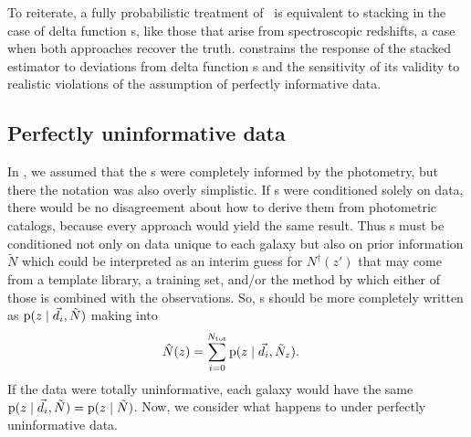 
To reiterate, a fully probabilistic treatment of \Nz\ is equivalent to stacking in the case of delta function \pzpdf s, like those that arise from spectroscopic redshifts, a case when both approaches recover the truth.
 constrains the response of the stacked estimator to deviations from delta function \pzpdf s and the sensitivity of its validity to realistic violations of the assumption of perfectly informative data.


\subsection{Perfectly uninformative data}

In , we assumed that the \pzpdf s were completely informed by the photometry, but there the notation was also overly simplistic.
If \pzpdf s were conditioned solely on data, there would be no disagreement about how to derive them from photometric catalogs, because every approach would yield the same result.
Thus \pzpdf s must be conditioned not only on data unique to each galaxy but also on prior information $\tilde{N}$ which could be interpreted as an interim guess for $N^{\dagger}(z')$ that may come from a template library, a training set, and/or the method by which either of those is combined with the observations.
So, \pzpdf s should be more completely written as $\mathrm{p}(z \mid \vec{d}_{i}, \tilde{N})$ making  into
\begin{align}
\eqlabel{eqn:stackwithprior}
\hat{N}(z) &= \sum_{i = 0}^{\ntot} \pr{z \gvn \data_{i}, \tilde{N}_{z}} .
\end{align}
If the data were totally uninformative, each galaxy would have the same $\mathrm{p}(z \mid \vec{d}_{i}, \tilde{N}) = \mathrm{p}(z \mid \tilde{N})$.
Now, we consider what happens to  under perfectly uninformative data.

